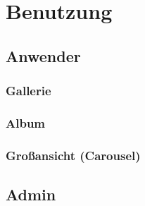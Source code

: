 \chapter{Benutzung}

\section{Anwender}
\subsection{Gallerie}

\subsection{Album}

\subsection{Großansicht (Carousel)}

\section{Admin}